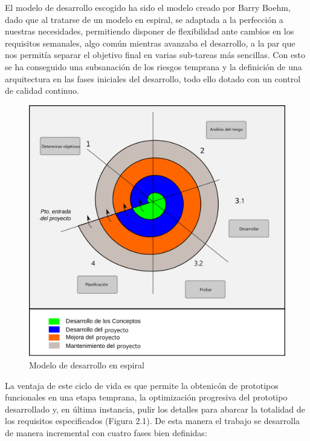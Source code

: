  El modelo de desarrollo escogido ha sido el modelo creado por Barry Boehm, dado que al tratarse de un modelo en espiral, se adaptada a la perfección a nuestras necesidades, permitiendo disponer de flexibilidad ante cambios en los requisitos semanales, algo común mientras avanzaba el desarrollo, a la par que nos permitía separar el objetivo final en varias sub-tareas más sencillas. Con esto se ha conseguido una subsanación de los riesgos temprana y la definición de una arquitectura en las fases iniciales del desarrollo, todo ello dotado con un control de calidad continuo.

\begin{figure}[H]
  \begin{center}
    \includegraphics[width=0.9\linewidth]{figures/modelo_espiral.png}
		\caption{Modelo de desarrollo en espiral}
		\label{fig.espiral}
		\end{center}
\end{figure}

La ventaja de este ciclo de vida es que permite la obtenicón de prototipos funcionales en una etapa temprana, la optimización progresiva del prototipo desarrollado y, en última instancia, pulir los detalles para abarcar la totalidad de los requisitos especificados (Figura 2.1). De esta manera el trabajo se desarrolla de manera incremental con cuatro fases bien definidas:

